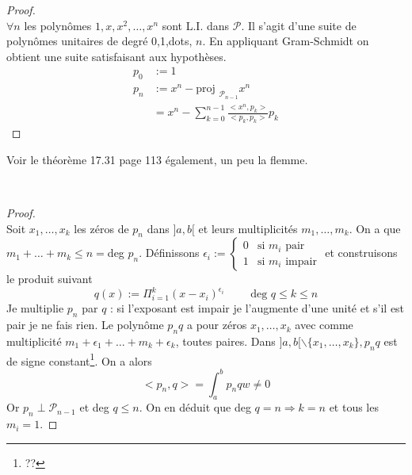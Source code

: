 	
	\begin{proof}\ \\
	$\forall n$ les polynômes $1,x,x^2,\dots,x^n$ sont L.I. dans $\mathcal{P}$. 
	Il s'agit d'une suite de polynômes unitaires de degré 0,1,dots, $n$. En 
	appliquant Gram-Schmidt on obtient une suite satisfaisant aux hypothèses.
	\begin{equation}
	\begin{array}{ll}
	p_0 &:= 1\\
	p_n &:= x^n - \text{proj }_{\mathcal{P}_{n-1}} x^n\\
	 & = x^n - \sum_{k=0}^{n-1} \frac{<x^n, p_k>}{<p_k,p_k>}p_k
	\end{array}
	\end{equation}
	\end{proof}
	Voir le théorème 17.31 page 113 également, un peu la flemme.
	
	
	
	\theor{\ \\
	$\forall w|_{[a,b]}, p_n$ possède $n$ zéros distincts dans $]a,b[$.}\ 
	
	\begin{proof}\ \\
	Soit $x_1, \dots, x_k$ les zéros de $p_n$ dans $]a,b[$ et leurs 
	multiplicités $m_1, \dots, m_k$. On a que $m_1 + \dots + m_k 
	\leq n = $deg $p_n$. Définissons $\epsilon_i := \left\{\begin{array}{ll}
	0 & \text{si $m_i$ pair}\\
	1 & \text{si $m_i$ impair}
	\end{array}\right.$ et construisons le produit suivant 
	\begin{equation}
	q(x) :=\Pi_{i=1}^k (x-x_i)^{\epsilon_i}\qquad \text{ deg } q \leq k \leq n
	\end{equation}
	Je multiplie $p_n$ par $q$ : si l'exposant est impair je l'augmente d'une 
	unité et s'il est pair je ne fais rien. Le polynôme $p_nq$ a pour zéros 
	$x_1, \dots, x_k$ avec comme multiplicité $m_1+\epsilon_1+\dots+m_k+
	\epsilon_k$, toutes paires. Dans $]a,b[\backslash\{x_1,\dots,x_k\}, p_nq$ 
	est de signe constant\footnote{??}. On a alors 
	\begin{equation}
	<p_n, q> = \int_a^b p_nqw \neq 0
	\end{equation}
	Or $p_n \perp \mathcal{P}_{n-1}$ et deg $q \leq n$. On en déduit que deg $q 
	= n \Longrightarrow k = n$ et tous les $m_i = 1$.
	\end{proof}
	
